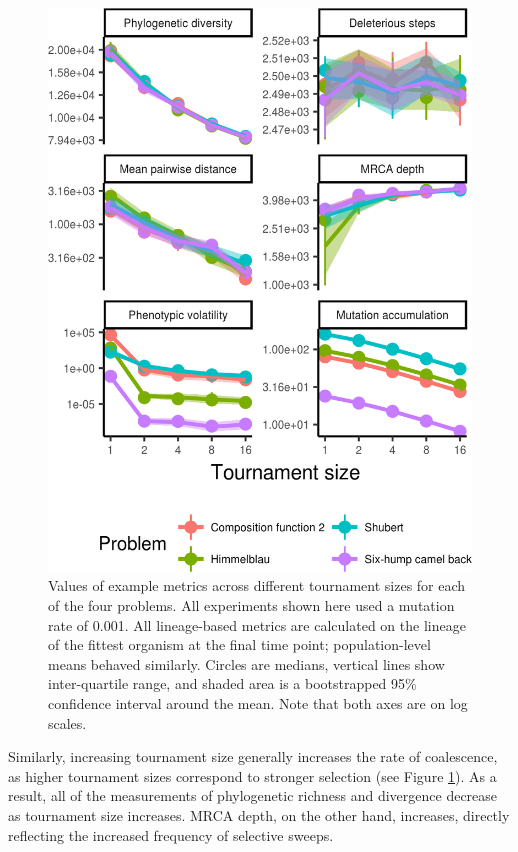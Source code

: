 \documentclass[letterpaper]{article}
\newcommand{\reduceCaptionPadding}{\setlength{\belowcaptionskip}{-10pt}}
\begin{document}
\begin{figure}
\includegraphics[width=\columnwidth]{figs/all_ts_crop.png}
\reduceCaptionPadding
\caption{\small Values of example metrics across different tournament sizes for each of the four problems. All experiments shown here used a mutation rate of 0.001. All lineage-based metrics are calculated on the lineage of the fittest organism at the final time point; population-level means behaved similarly. Circles are medians, vertical lines show inter-quartile range, and shaded area is a bootstrapped 95\% confidence interval around the mean. Note that both axes are on log scales.}
\label{fig:ts}
\end{figure}

Similarly, increasing tournament size generally increases the rate of coalescence, as higher tournament sizes correspond to stronger selection (see Figure \ref{fig:ts}). As a result, all of the measurements of phylogenetic richness and divergence decrease as tournament size increases. MRCA depth, on the other hand, increases, directly reflecting the increased frequency of selective sweeps. 
\end{document}
